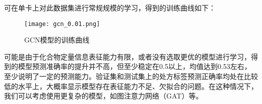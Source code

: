 可在单卡上对此数据集进行常规规模的学习，得到的训练曲线如下：


\begin{figure}[H]
  \centering
  \texttt{[image: gcn\_0.01.png]}
  \caption{GCN模型的训练曲线}
  \label{fig:gcn_train_curve}
\end{figure}

可能是由于化合物定量信息表征能力有限，或者没有选取更优的模型进行学习，得到的模型预测准确率的提升并不高，但至少稳定在0.5以上，均值达到0.53左右，至少说明了一定的预测能力。验证集和测试集上的处方标签预测正确率均处在比较低的水平上，大概率显示模型存在表征能力不足、欠拟合的问题。在这种情况下，我们可以考虑使用更复杂的模型，如图注意力网络（GAT）等。